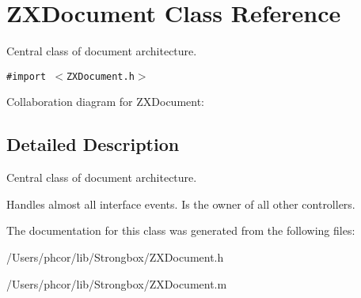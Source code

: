 \hypertarget{interface_z_x_document}{
\section{ZXDocument Class Reference}
\label{interface_z_x_document}
}
Central class of document architecture.  


{\tt \#import $<$ZXDocument.h$>$}

Collaboration diagram for ZXDocument:

\subsection{Detailed Description}
Central class of document architecture. 

Handles almost all interface events. Is the owner of all other controllers. 

The documentation for this class was generated from the following files:\begin{CompactItemize}
\item 
/Users/phcor/lib/Strongbox/ZXDocument.h\item 
/Users/phcor/lib/Strongbox/ZXDocument.m\end{CompactItemize}
